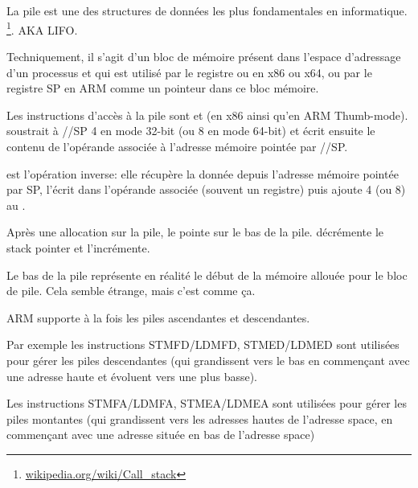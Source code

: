 \section{\Stack}
\label{sec:stack}
\myindex{\Stack}

La pile est une des structures de données les plus fondamentales en informatique.
\footnote{\href{http://go.yurichev.com/17119}{wikipedia.org/wiki/Call\_stack}}.
\ac{AKA} \ac{LIFO}.

Techniquement, il s'agit d'un bloc de mémoire présent dans l'espace d'adressage
d'un processus et qui est utilisé par le registre \ESP ou \RSP en x86 ou x64,
ou par le registre \ac{SP} en ARM comme un pointeur dans ce bloc mémoire.

Les instructions d'accès à la pile sont \PUSH et \POP (en x86 ainsi qu'en ARM Thumb-mode).
\PUSH soustrait à \ESP/\RSP/\ac{SP} 4 en mode 32-bit (ou 8 en mode 64-bit) et écrit
ensuite le contenu de l'opérande associée à l'adresse mémoire pointée par \ESP/\RSP/\ac{SP}.

\POP est l'opération inverse: elle récupère la donnée depuis l'adresse mémoire pointée par \ac{SP},
l'écrit dans l'opérande associée (souvent un registre) puis ajoute 4 (ou 8) au .

Après une allocation sur la pile, le  pointe sur le bas de la pile.
\PUSH décrémente le \gls{stack pointer} et \POP l'incrémente.

Le bas de la pile représente en réalité le début de la mémoire allouée pour
 le bloc de pile. Cela semble étrange, mais c'est comme ça.

ARM supporte à la fois les piles ascendantes et descendantes.


Par exemple les instructions \ac{STMFD}/\ac{LDMFD}, \ac{STMED}/\ac{LDMED} sont utilisées pour gérer les piles
descendantes (qui grandissent vers le bas en commençant avec une adresse haute et évoluent vers une plus basse).

Les instructions \ac{STMFA}/\ac{LDMFA}, \ac{STMEA}/\ac{LDMEA} sont utilisées pour gérer les piles montantes
(qui grandissent vers les adresses hautes de l'adresse space, en commençant avec une adresse située en bas de l'adresse space)

